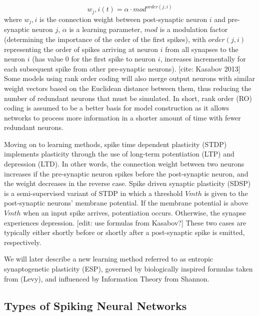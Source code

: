 \documentclass[journal]{./sty/IEEEtran}
\begin{document}
\begin{equation}
w_j,i(t) = {\alpha}\cdot{mod^{order(j,i)}} 
\end{equation} 
where $w_j,i$ is the connection weight between post-synaptic neuron $i$ and pre-synaptic neuron $j$, $\alpha$ is a learning parameter, $mod$ is a modulation factor (determining the importance of the order of the first spikes), with $order(j,i)$ representing the order of spikes arriving at neuron $i$ from all synapses to the neuron $i$ (has value $0$ for the first spike to neuron $i$, increases incrementally for each subsequent spike from other pre-synaptic neurons). [cite: Kasabov 2013]
Some models using rank order coding will also merge output neurons with similar weight vectors based on the Euclidean distance between them, thus reducing the number of redundant neurons that must be simulated.
In short, rank order (RO) coding is assumed to be a better basis for model construction as it allows networks to process more information in a shorter amount of time with fewer redundant neurons. 

Moving on to learning methods, spike time dependent plasticity (STDP) implements plasticity through the use of long-term potentiation (LTP) and depression (LTD). 
In other words, the connection weight between two neurons increases if the pre-synaptic neuron spikes before the post-synaptic neuron, and the weight decreases in the reverse case. 
Spike driven synaptic plasticity (SDSP) is a semi-supervised variant of STDP in which a threshold $Vmth$ is given to the post-synaptic neurons' membrane potential. 
If the membrane potential is above $Vmth$ when an input spike arrives, potentiation occurs. 
Otherwise, the synapse experiences depression.
[edit: use formulas from Kasabov?] 
These two cases are typically either shortly before or shortly after a post-synaptic spike is emitted, respectively. 

We will later describe a new learning method referred to as entropic synaptogenetic plasticity (ESP), governed by biologically inspired formulas taken from (Levy), and influenced by Information Theory from Shannon.

\subsection{Types of Spiking Neural Networks}
\end{document}
